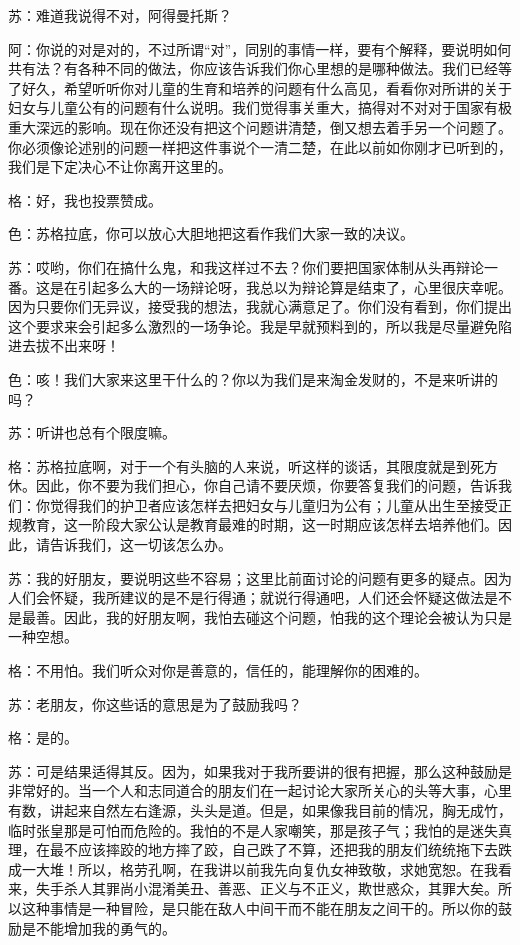 \documentclass[12pt,oneside]{book}
\begin{document}
苏：难道我说得不对，阿得曼托斯？

阿：你说的对是对的，不过所谓“对”，同别的事情一样，要有个解释，要说明如何共有法？有各种不同的做法，你应该告诉我们你心里想的是哪种做法。我们已经等了好久，希望听听你对儿童的生育和培养的问题有什么高见，看看你对所讲的关于妇女与儿童公有的问题有什么说明。我们觉得事关重大，搞得对不对对于国家有极重大深远的影响。现在你还没有把这个问题讲清楚，倒又想去着手另一个问题了。你必须像论述别的问题一样把这件事说个一清二楚，在此以前如你刚才已听到的，我们是下定决心不让你离开这里的。

格：好，我也投票赞成。

色：苏格拉底，你可以放心大胆地把这看作我们大家一致的决议。

苏：哎哟，你们在搞什么鬼，和我这样过不去？你们要把国家体制从头再辩论一番。这是在引起多么大的一场辩论呀，我总以为辩论算是结束了，心里很庆幸呢。因为只要你们无异议，接受我的想法，我就心满意足了。你们没有看到，你们提出这个要求来会引起多么激烈的一场争论。我是早就预料到的，所以我是尽量避免陷进去拔不出来呀！

色：咳！我们大家来这里干什么的？你以为我们是来淘金发财的，不是来听讲的吗？

苏：听讲也总有个限度嘛。

格：苏格拉底啊，对于一个有头脑的人来说，听这样的谈话，其限度就是到死方休。因此，你不要为我们担心，你自己请不要厌烦，你要答复我们的问题，告诉我们：你觉得我们的护卫者应该怎样去把妇女与儿童归为公有；儿童从出生至接受正规教育，这一阶段大家公认是教育最难的时期，这一时期应该怎样去培养他们。因此，请告诉我们，这一切该怎么办。

苏：我的好朋友，要说明这些不容易；这里比前面讨论的问题有更多的疑点。因为人们会怀疑，我所建议的是不是行得通；就说行得通吧，人们还会怀疑这做法是不是最善。因此，我的好朋友啊，我怕去碰这个问题，怕我的这个理论会被认为只是一种空想。

格：不用怕。我们听众对你是善意的，信任的，能理解你的困难的。

苏：老朋友，你这些话的意思是为了鼓励我吗？

格：是的。

苏：可是结果适得其反。因为，如果我对于我所要讲的很有把握，那么这种鼓励是非常好的。当一个人和志同道合的朋友们在一起讨论大家所关心的头等大事，心里有数，讲起来自然左右逢源，头头是道。但是，如果像我目前的情况，胸无成竹，临时张皇那是可怕而危险的。我怕的不是人家嘲笑，那是孩子气；我怕的是迷失真理，在最不应该摔跤的地方摔了跤，自己跌了不算，还把我的朋友们统统拖下去跌成一大堆！所以，格劳孔啊，在我讲以前我先向复仇女神致敬，求她宽恕。在我看来，失手杀人其罪尚小混淆美丑、善恶、正义与不正义，欺世惑众，其罪大矣。所以这种事情是一种冒险，是只能在敌人中间干而不能在朋友之间干的。所以你的鼓励是不能增加我的勇气的。
\end{document}
